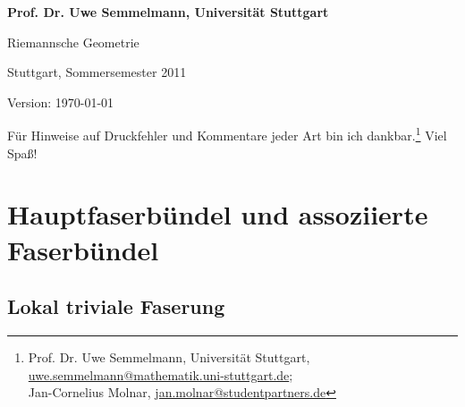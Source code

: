 \documentclass[%
	paper=a5,%
	fleqn,%
	DIV=18,%
	BCOR=0mm,
	fontsize=11pt,
	titlepage=false,%
	bibliography=totoc,
	DIV=18,%
	twoside=true,
	pdftitle=Riemannsche Geometrie,
	pdfauthor=Uwe Semmelmann,
	numbers=noendperiod]%
	{scrbook}
\begin{document}
\begin{titlepage}
\bfseries\color{darkgray}
\vspace*{2mm}
\noindent
Prof. Dr. Uwe Semmelmann, Universität Stuttgart

\begin{center}
\vspace*{10mm}
\noindent
{\huge\color{darkblue} Riemannsche Geometrie}

\vspace*{4mm}

Stuttgart, Sommersemester 2011
\end{center}

\vspace*{\fill}

\begin{flushright}
\small
Version: \today\
\vspace*{5mm}

Für Hinweise auf Druckfehler und Kommentare jeder Art bin ich 
dankbar.\footnote{\color{darkgray}
Prof. Dr. Uwe Semmelmann, Universität Stuttgart,
\href{mailto:uwe.semmelmann@mathematik.uni-stuttgart.de}{uwe.semmelmann@mathematik.uni-stuttgart.de};\\
Jan-Cornelius Molnar,
\href{mailto:jan.molnar@studentpartners.de}{jan.molnar@studentpartners.de}}
Viel Spaß!
\end{flushright}
\end{titlepage}


\tableofcontents

%




\chapter{Hauptfaserbündel und assoziierte Faserbündel}

\section{Lokal triviale Faserung}
\end{document}

